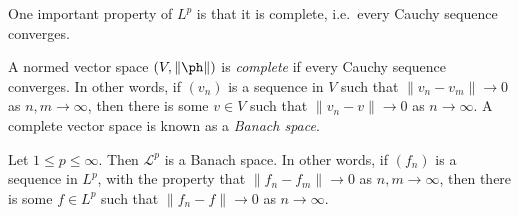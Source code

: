 \documentclass[a4paper]{article}
\begin{document}
One important property of $L^p$ is that it is complete, i.e.\ every Cauchy sequence converges.
\begin{defi}
  A normed vector space $(V, \|\ph\|)$ is \emph{complete} if every Cauchy sequence converges. In other words, if $(v_n)$ is a sequence in $V$ such that $\|v_n - v_m\| \to 0$ as $n, m \to \infty$, then there is some $v \in V$ such that $\|v_n - v\| \to 0$ as $n \to \infty$. A complete vector space is known as a \emph{Banach space}.
\end{defi}

\begin{thm}
  Let $1 \leq p \leq \infty$. Then $\mathcal{L}^p$ is a Banach space. In other words, if $(f_n)$ is a sequence in $L^p$, with the property that $\|f_n - f_m\| \to 0$ as $n, m \to \infty$, then there is some $f \in L^p$ such that $\|f_n - f\| \to 0$ as $n \to \infty$.
\end{thm}
\end{document}
